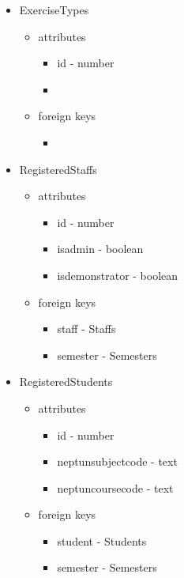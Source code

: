 \begin{itemize}
	\item ExerciseTypes
	\begin{itemize}
		\item attributes
		\begin{itemize}
			\item id - number
			\item \todo{}
		\end{itemize}
		\item foreign keys
		\begin{itemize}
			\item \todo{}
		\end{itemize}
	\end{itemize}
	
	\item RegisteredStaffs
	\begin{itemize}
		\item attributes
		\begin{itemize}
			\item id - number
			\item isadmin - boolean
			\item isdemonstrator - boolean
		\end{itemize}
		\item foreign keys
		\begin{itemize}
			\item staff - Staffs
			\item semester - Semesters
		\end{itemize}
	\end{itemize}
	
	\item RegisteredStudents
	\begin{itemize}
		\item attributes
		\begin{itemize}
			\item id - number
			\item neptunsubjectcode - text
			\item neptuncoursecode - text
		\end{itemize}
		\item foreign keys
		\begin{itemize}
			\item student - Students
			\item semester - Semesters
		\end{itemize}
	\end{itemize}
	

\end{itemize}
